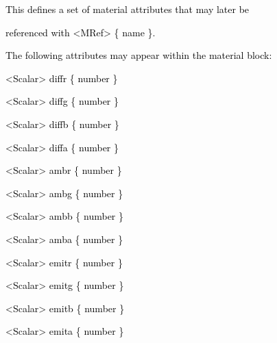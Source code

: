 \documentclass[a4paper]{article}
\newcommand\textstyleOOoComputerKeyWord[1]{\textrm{\textcolor[rgb]{0.0,0.0,0.5019608}{#1}}}
\begin{document}
\bigskip

{\color{black}
\textstyleOOoComputerKeyWord{\textcolor{black}{\ \ This defines a set of material attributes that may later be}}}

{\color{black}
\textstyleOOoComputerKeyWord{\textcolor{black}{\ \ referenced with {\textless}MRef{\textgreater} \{ name \}.}}}


\bigskip

{\color{black}
\textstyleOOoComputerKeyWord{\textcolor{black}{\ \ The following attributes may appear within the material block:}}}


\bigskip

{\color{black}
\textstyleOOoComputerKeyWord{\textcolor{black}{\ \ {\textless}Scalar{\textgreater} diffr \{ number \}}}}

{\color{black}
\textstyleOOoComputerKeyWord{\textcolor{black}{\ \ {\textless}Scalar{\textgreater} diffg \{ number \}}}}

{\color{black}
\textstyleOOoComputerKeyWord{\textcolor{black}{\ \ {\textless}Scalar{\textgreater} diffb \{ number \}}}}

{\color{black}
\textstyleOOoComputerKeyWord{\textcolor{black}{\ \ {\textless}Scalar{\textgreater} diffa \{ number \}}}}


\bigskip

{\color{black}
\textstyleOOoComputerKeyWord{\textcolor{black}{\ \ {\textless}Scalar{\textgreater} ambr \{ number \}}}}

{\color{black}
\textstyleOOoComputerKeyWord{\textcolor{black}{\ \ {\textless}Scalar{\textgreater} ambg \{ number \}}}}

{\color{black}
\textstyleOOoComputerKeyWord{\textcolor{black}{\ \ {\textless}Scalar{\textgreater} ambb \{ number \}}}}

{\color{black}
\textstyleOOoComputerKeyWord{\textcolor{black}{\ \ {\textless}Scalar{\textgreater} amba \{ number \}}}}


\bigskip

{\color{black}
\textstyleOOoComputerKeyWord{\textcolor{black}{\ \ {\textless}Scalar{\textgreater} emitr \{ number \}}}}

{\color{black}
\textstyleOOoComputerKeyWord{\textcolor{black}{\ \ {\textless}Scalar{\textgreater} emitg \{ number \}}}}

{\color{black}
\textstyleOOoComputerKeyWord{\textcolor{black}{\ \ {\textless}Scalar{\textgreater} emitb \{ number \}}}}

{\color{black}
\textstyleOOoComputerKeyWord{\textcolor{black}{\ \ {\textless}Scalar{\textgreater} emita \{ number \}}}}
\end{document}
